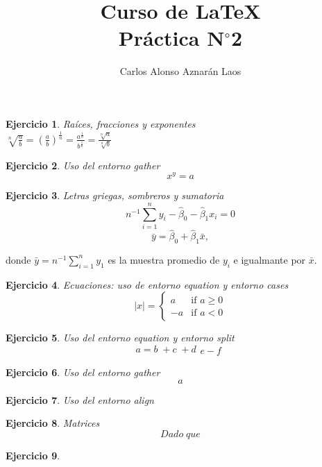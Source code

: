 \documentclass[12pt,a4paper]{article}
\author{Carlos Alonso Aznarán Laos}
\title{Curso de \LaTeX \\ Práctica  N$ ^{\circ}$2}
\newtheorem{ejer}{Ejercicio}%
\begin{document}
\maketitle %
\begin{ejer}
Raíces, fracciones y exponentes\\
$\sqrt[n]{\frac{a}{b}} = (\frac{{a}}{{b}})^\frac{1}{n} = \frac{a^{\frac{1}{n}}}{b^{\frac{1}{n}}} = \frac{\sqrt[n]{a}}{\sqrt[n]{b}}$
\end{ejer}

\begin{ejer}
Uso del entorno gather
\begin{equation*}
x^{y}=a
\end{equation*}

\end{ejer}

\begin{ejer}
Letras griegas, sombreros y sumatoria
\begin{displaymath}
n^{-1}\sum^{n}_{i=1}{y_{i}- \hat{\beta}_{0} - \hat{\beta}_{1}
x_{i}}=0
\end{displaymath}
\begin{displaymath}
\bar{y}=\hat{\beta}_{0}+\hat{\beta}_{1}\bar{x},\end{displaymath}
\end{ejer}%
donde $\bar{y}=n^{-1}\sum^{n}_{i=1}y_{1}$ es la muestra promedio de $y_{i}$ e igualmante por $\bar{x}$.
\begin{ejer}
Ecuaciones: uso de entorno equation y entorno cases
\begin{equation*}
|x| =
\begin{cases}
a & \text{if $a\ge 0$}\\
-a & \text{if $a< 0$}
\end{cases}
\end{equation*}

\end{ejer}

\begin{ejer}
Uso del entorno equation y entorno split
\begin{equation*}
a = b\; + c\; + d
\begin{split}
e-f
\end{split}
\end{equation*}
\end{ejer}
\begin{ejer}
Uso del entorno gather
\begin{equation*}
a
\end{equation*}
\end{ejer}
\begin{ejer}
Uso del entorno align
\end{ejer}
\begin{ejer}
Matrices
\begin{equation*}
Dado\;que
\end{equation*}
\end{ejer}
\begin{ejer}

\end{ejer}
\begin{thebibliography}{9}
\end{thebibliography}
\end{document}
